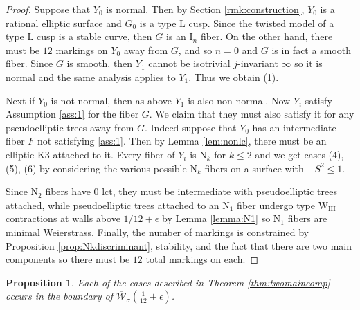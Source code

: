\documentclass[11pt]{amsart}
\newtheorem{prop}[theorem]{Proposition}
\theoremstyle{definition}
\theoremstyle{remark}
\newcommand{\calW}{\mathcal W}
\newcommand{\ktwelve}{\overline{\calW}_\sigma({\frac{1}{12}+\epsilon})}
\begin{document}
\begin{proof}
		Suppose that $Y_0$ is normal. Then by Section \ref{rmk:construction}, $Y_0$ is a rational elliptic surface and $G_0$ is a type $\mathrm{L}$ cusp. Since the twisted model of a type $\mathrm{L}$ cusp is a stable curve, then $G$ is an $\mathrm{I}_n$ fiber. On the other hand, there must be $12$ markings on $Y_0$ away from $G$, and so $n = 0$ and $G$ is in fact a smooth fiber. Since $G$ is smooth, then $Y_1$ cannot be isotrivial $j$-invariant $\infty$ so it is normal and the same analysis applies to $Y_1$. Thus we obtain (1). 
		
		Next if $Y_0$ is not normal, then as above $Y_1$ is also non-normal. Now $Y_i$ satisfy Assumption \ref{ass:1} for the fiber $G$. We claim that they must also satisfy it for any pseudoelliptic trees away from $G$. Indeed suppose that $Y_0$ has an intermediate fiber $F$ not satisfying \ref{ass:1}. Then by Lemma \ref{lem:nonlc},  there must be an elliptic K3 attached to it. Every fiber of $Y_i$ is $\mathrm{N}_k$ for $k \le 2$ and we get  cases (4), (5), (6) by considering the various possible $\mathrm{N}_k$ fibers on a surface with $-S^2 \le 1$. 
		
		Since $\mathrm{N}_2$ fibers have $0$ lct, they must be intermediate with pseudoelliptic trees attached, while pseudoelliptic trees attached to an $\mathrm{N}_1$ fiber undergo type $\mathrm{W}_\mathrm{III}$ contractions at walls above $1/12 + \epsilon$ by Lemma \ref{lemma:N1} so $\mathrm{N}_1$ fibers are minimal Weierstrass. Finally, the number of markings is constrained by Proposition \ref{prop:Nkdiscriminant}, stability, and the fact that there are two main components so there must be $12$ total markings on each. \end{proof}
	
	\begin{prop}\label{prop:exist2} Each of the cases described in Theorem \ref{thm:twomaincomp} occurs in the boundary of $\ktwelve$. 
	\end{prop} 
	
\end{document}

